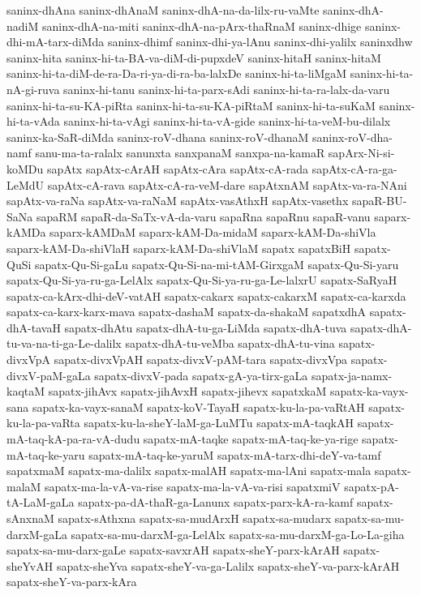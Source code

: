 {saninx-dhAna
saninx-dhAnaM
saninx-dhA-na-da-lilx-ru-vaMte
saninx-dhA-nadiM
saninx-dhA-na-miti
saninx-dhA-na-pArx-thaRnaM
saninx-dhige
saninx-dhi-mA-tarx-diMda
saninx-dhimf
saninx-dhi-ya-lAnu
saninx-dhi-yalilx
saninxdhw
saninx-hita
saninx-hi-ta-BA-va-diM-di-pupxdeV
saninx-hitaH
saninx-hitaM
saninx-hi-ta-diM-de-ra-Da-ri-ya-di-ra-ba-lalxDe
saninx-hi-ta-liMgaM
saninx-hi-ta-nA-gi-ruva
saninx-hi-tanu
saninx-hi-ta-parx-sAdi
saninx-hi-ta-ra-lalx-da-varu
saninx-hi-ta-su-KA-piRta
saninx-hi-ta-su-KA-piRtaM
saninx-hi-ta-suKaM
saninx-hi-ta-vAda
saninx-hi-ta-vAgi
saninx-hi-ta-vA-gide
saninx-hi-ta-veM-bu-dilalx
saninx-ka-SaR-diMda
saninx-roV-dhana
saninx-roV-dhanaM
saninx-roV-dha-namf
sanu-ma-ta-ralalx
sanunxta
sanxpanaM
sanxpa-na-kamaR
sapArx-Ni-si-koMDu
sapAtx
sapAtx-cArAH
sapAtx-cAra
sapAtx-cA-rada
sapAtx-cA-ra-ga-LeMdU
sapAtx-cA-rava
sapAtx-cA-ra-veM-dare
sapAtxnAM
sapAtx-va-ra-NAni
sapAtx-va-raNa
sapAtx-va-raNaM
sapAtx-vasAthxH
sapAtx-vasethx
sapaR-BU-SaNa
sapaRM
sapaR-da-SaTx-vA-da-varu
sapaRna
sapaRnu
sapaR-vanu
saparx-kAMDa
saparx-kAMDaM
saparx-kAM-Da-midaM
saparx-kAM-Da-shiVla
saparx-kAM-Da-shiVlaH
saparx-kAM-Da-shiVlaM
sapatx
sapatxBiH
sapatx-QuSi
sapatx-Qu-Si-gaLu
sapatx-Qu-Si-na-mi-tAM-GirxgaM
sapatx-Qu-Si-yaru
sapatx-Qu-Si-ya-ru-ga-LelAlx
sapatx-Qu-Si-ya-ru-ga-Le-lalxrU
sapatx-SaRyaH
sapatx-ca-kArx-dhi-deV-vatAH
sapatx-cakarx
sapatx-cakarxM
sapatx-ca-karxda
sapatx-ca-karx-karx-mava
sapatx-dashaM
sapatx-da-shakaM
sapatxdhA
sapatx-dhA-tavaH
sapatx-dhAtu
sapatx-dhA-tu-ga-LiMda
sapatx-dhA-tuva
sapatx-dhA-tu-va-na-ti-ga-Le-dalilx
sapatx-dhA-tu-veMba
sapatx-dhA-tu-vina
sapatx-divxVpA
sapatx-divxVpAH
sapatx-divxV-pAM-tara
sapatx-divxVpa
sapatx-divxV-paM-gaLa
sapatx-divxV-pada
sapatx-gA-ya-tirx-gaLa
sapatx-ja-namx-kaqtaM
sapatx-jihAvx
sapatx-jihAvxH
sapatx-jihevx
sapatxkaM
sapatx-ka-vayx-sana
sapatx-ka-vayx-sanaM
sapatx-koV-TayaH
sapatx-ku-la-pa-vaRtAH
sapatx-ku-la-pa-vaRta
sapatx-ku-la-sheY-laM-ga-LuMTu
sapatx-mA-taqkAH
sapatx-mA-taq-kA-pa-ra-vA-dudu
sapatx-mA-taqke
sapatx-mA-taq-ke-ya-rige
sapatx-mA-taq-ke-yaru
sapatx-mA-taq-ke-yaruM
sapatx-mA-tarx-dhi-deY-va-tamf
sapatxmaM
sapatx-ma-dalilx
sapatx-malAH
sapatx-ma-lAni
sapatx-mala
sapatx-malaM
sapatx-ma-la-vA-va-rise
sapatx-ma-la-vA-va-risi
sapatxmiV
sapatx-pA-tA-LaM-gaLa
sapatx-pa-dA-thaR-ga-Lanunx
sapatx-parx-kA-ra-kamf
sapatx-sAnxnaM
sapatx-sAthxna
sapatx-sa-mudArxH
sapatx-sa-mudarx
sapatx-sa-mu-darxM-gaLa
sapatx-sa-mu-darxM-ga-LelAlx
sapatx-sa-mu-darxM-ga-Lo-La-giha
sapatx-sa-mu-darx-gaLe
sapatx-savxrAH
sapatx-sheY-parx-kArAH
sapatx-sheYvAH
sapatx-sheYva
sapatx-sheY-va-ga-Lalilx
sapatx-sheY-va-parx-kArAH
sapatx-sheY-va-parx-kAra
}
